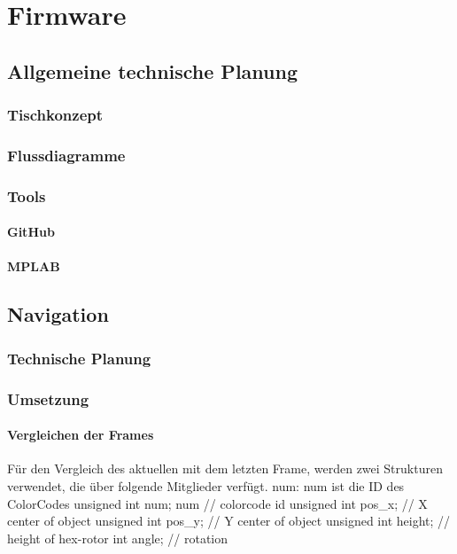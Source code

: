 \chapter{Firmware}
\renewcommand{\kapitelautor}{Autor: Lucas Ullrich}

\section{Allgemeine technische Planung}

  \subsection{Tischkonzept}

  \subsection{Flussdiagramme}

  \subsection{Tools}

    \subsubsection{GitHub}

    \subsubsection{MPLAB}

\section{Navigation}

  \subsection{Technische Planung}

  \subsection{Umsetzung}

    \subsubsection{Vergleichen der Frames}
    Für den Vergleich des aktuellen mit dem letzten Frame, werden zwei Strukturen verwendet, die über folgende Mitglieder verfügt.
    num: num ist die ID des ColorCodes
      unsigned int num;
      num
      // colorcode id
      unsigned int pos\_x; // X center of object
      unsigned int pos\_y; // Y center of object
      unsigned int height; // height of hex-rotor
      int angle; // rotation



